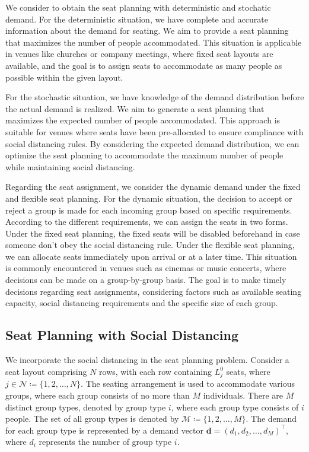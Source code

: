 We consider to obtain the seat planning with deterministic and stochatic demand. For the deterministic situation, we have complete and accurate information about the demand for seating. We aim to provide a seat planning that maximizes the number of people accommodated. This situation is applicable in venues like churches or company meetings, where fixed seat layouts are available, and the goal is to assign seats to accommodate as many people as possible within the given layout.


For the stochastic situation, we have knowledge of the demand distribution before the actual demand is realized. We aim to generate a seat planning that maximizes the expected number of people accommodated. This approach is suitable for venues where seats have been pre-allocated to ensure compliance with social distancing rules. By considering the expected demand distribution, we can optimize the seat planning to accommodate the maximum number of people while maintaining social distancing.

Regarding the seat assignment, we consider the dynamic demand under the fixed and flexible seat planning. For the dynamic situation, the decision to accept or reject a group is made for each incoming group based on specific requirements. According to the different requirements, we can assign the seats in two forms. Under the fixed seat planning, the fixed seats will be disabled beforehand in case someone don't obey the social distancing rule. Under the flexible seat planning, we can allocate seats immediately upon arrival or at a later time. This situation is commonly encountered in venues such as cinemas or music concerts, where decisions can be made on a group-by-group basis. The goal is to make timely decisions regarding seat assignments, considering factors such as available seating capacity, social distancing requirements and the specific size of each group.


\subsection{Seat Planning with Social Distancing}
We incorporate the social distancing in the seat planning problem. Consider a seat layout comprising $N$ rows, with each row containing $L_j^0$ seats, where $j \in \mathcal{N} \coloneqq \{1,2, \ldots, N\}$. The seating arrangement is used to accommodate various groups, where each group consists of no more than $M$ individuals. There are $M$ distinct group types, denoted by group type $i$, where each group type consists of $i$ people. The set of all group types is denoted by $\mathcal{M} \coloneqq \{1, 2, \ldots, M\}$. The demand for each group type is represented by a demand vector $\mathbf{d} = (d_1, d_2, \ldots, d_M)^{\intercal}$, where $d_i$ represents the number of group type $i$.


